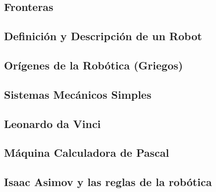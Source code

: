 \documentclass[a4paper,11pt]{article}
\begin{document}
\subsection{Fronteras}


\newpage


\subsection{Definición y Descripción de un Robot}


\subsection{Orígenes de la Robótica (Griegos)}


\subsection{Sistemas Mecánicos Simples}


\subsection{Leonardo da Vinci}


\subsection{Máquina Calculadora de Pascal}


\subsection{Isaac Asimov y las reglas de la robótica}


\end{document}
